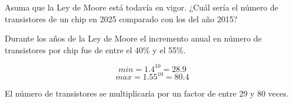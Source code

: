 \begin{acexercise}\end{acexercise}

Asuma que la Ley de Moore está todavía en vigor.
¿Cuál sería el número de transistores de un chip en 2025 comparado con los del año 2015?


\begin{acsolution}\end{acsolution}

Durante los años de la Ley de Moore el incremento anual en número de transistores por chip
fue de entre el 40\% y el 55\%.

\[min = 1.4^{10} = 28.9\]
\[max = 1.55^{10} = 80.4\]

El número de transistores se multiplicaría por un factor de entre 29 y 80 veces.

